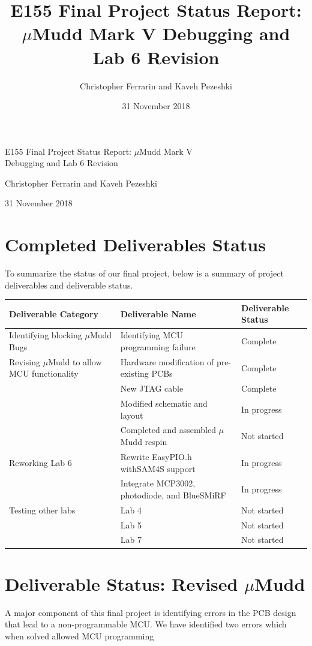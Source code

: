 \documentclass[12pt]{article}
\title{E155 Final Project Status Report: $\mu$Mudd Mark V Debugging and Lab 6 Revision}
\author{Christopher Ferrarin and Kaveh Pezeshki}
\date{31 November 2018}
\begin{document}
	\begin{LARGE}
	\noindent
		E155 
		Final 
		Project 
		Status
		Report: 
		$\mu$Mudd 
		Mark V \\
		Debugging 
		and 
		Lab 
		6 
		Revision
	\end{LARGE}

	\vspace{0.2cm}
	
	\begin{large}
	Christopher Ferrarin and Kaveh Pezeshki
	
	31 November 2018
	\end{large}

\section{Completed Deliverables Status}
To summarize the status of our final project, below is a summary of project deliverables and deliverable status.

	\begin{center}
	\begin{tabular}{p{6cm}p{5cm}p{4cm}}
	Deliverable Category & Deliverable Name & Deliverable Status\\
	\hline
	Identifying blocking $\mu$Mudd Bugs & Identifying MCU programming failure & Complete \\
	Revising $\mu$Mudd to allow MCU functionality & Hardware modification of pre-existing PCBs & Complete \\
	& New JTAG cable & Complete \\
	& Modified schematic and layout & In progress \\
	& Completed and assembled $\mu$Mudd respin & Not started \\
	Reworking Lab 6 & Rewrite EasyPIO.h withSAM4S support & In progress \\
	& Integrate MCP3002, photodiode, and BlueSMiRF & In progress \\
	Testing other labs & Lab 4 & Not started \\
	& Lab 5 & Not started \\
	& Lab 7 & Not started
	\end{tabular}
	\end{center}

\section{Deliverable Status: Revised $\mu$Mudd}

A major component of this final project is identifying errors in the PCB design that lead to a non-programmable MCU. We have identified two errors which when solved allowed MCU programming
\end{document}

